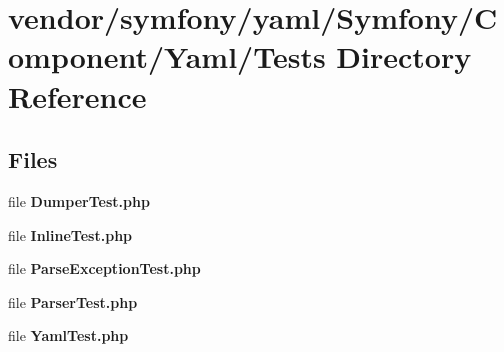 \section{vendor/symfony/yaml/\+Symfony/\+Component/\+Yaml/\+Tests Directory Reference}
\label{dir_0c9a3d652e2c1c7574b5e8954530d778}
\subsection*{Files}
\begin{DoxyCompactItemize}
\item 
file {\bf Dumper\+Test.\+php}
\item 
file {\bf Inline\+Test.\+php}
\item 
file {\bf Parse\+Exception\+Test.\+php}
\item 
file {\bf Parser\+Test.\+php}
\item 
file {\bf Yaml\+Test.\+php}
\end{DoxyCompactItemize}
